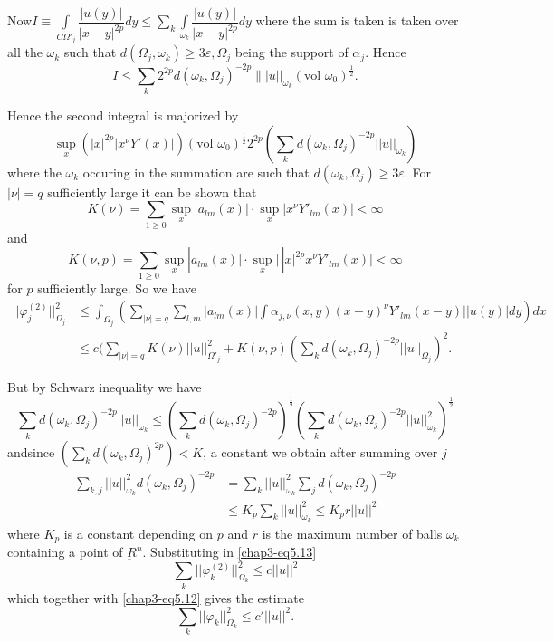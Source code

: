  Now\pageoriginale $I \equiv \int\limits_{C \Omega'_j}
 \dfrac{|u(y)|}{|x-y|^{2p}} dy \leq \sum\limits_{k} \int\limits_{\omega_k}
 \dfrac{|u(y)|}{|x-y|^{2p}} dy$ where the sum is taken is taken over
 all the $\omega_k$ such that $d(\Omega_j, \omega_k ) \geq 3
 \varepsilon, \Omega_j$ being the support of $\alpha_j$. Hence   
 $$
 I \leq \sum\limits_{k} 2^{2p}d (\omega_k, \Omega_j)^{-2p} \||
 u||_{\omega_k} (\text{vol } \omega_0)^{\frac{1}{2}}. 
 $$

 Hence the second integral is majorized by 
 $$
  \sup\limits_{x}(|x|^{2p}|x^\nu Y' (x)|) (\text{vol
  }\omega_0)^{\frac{1}{2}}2^{2p} \left(\sum_k d (\omega_k,
  \Omega_j)^{-2p}||u||_{\omega_k}\right)  
  $$
 where the $\omega_k$ occuring in the summation are such that
 $d(\omega_k, \Omega_j) \geq 3 \varepsilon $. 
 For $|\nu| = q$ sufficiently large it can be shown that 
 $$ 
 K(\nu ) = \sum\limits_{1 \geq 0}
 \sup\limits_{x}|a_{lm}(x)| \cdot \sup\limits_{x}|x^\nu
 Y'_{lm}(x)  | < \infty  
 $$
and
$$
K (\nu,p) = \sum\limits_{1\geq 0} \sup\limits_x | a_{lm} (x) \big| \cdot
\sup\limits_x \big| \, |x|^{2p} x^\nu Y'_{lm} (x) \big| < \infty
$$
for $p$ sufficiently large. So we have 
{\fontsize{10pt}{12pt}\selectfont
 \begin{align*}
\big|\big|\varphi^{(2)}_j \big|\big|^2_{\Omega_j} & \leq
\int_{\Omega_j} \left(\sum\limits_{|\nu | =q}\sum\limits_{l,m}| a_{lm}(x) | 
\int \alpha_{j,\nu}(x,y)  (x-y)^\nu Y'_{lm}(x-y) \big|\big|u (y) \big|
dy\right) dx\\
&  \leq c \Big( \sum\limits_{|\nu | =q} K (\nu ) ||u||^2_{\Omega'_j}+
K (\nu, p) \left(\sum_k d (\omega_k, \Omega_j
)^{-2p}||u||_{\Omega_j}\right)^2. 
\tag{5.13} \label{chap3-eq5.13}
 \end{align*}}\relax

But by Schwarz inequality we have 
$$
\sum_k d(\omega_k, \Omega_j)^{-2p} || u ||_{\omega_k} \leq \left(\sum_k d
(\omega_k, \Omega_j)^{-2p}\right)^{\frac{1}{2}}\left(\sum\limits_{k}d
(\omega_k,\Omega_j)^{-2p}||u||^2_{\omega_k}\right)^{\frac{1}{2}} 
$$
and\pageoriginale since $(\sum_k d(\omega_k, \Omega_j)^{2p}) < K$, a
constant we obtain after summing over $j$   
\begin{align*}
 \sum\limits_{k,j} ||u||^2_{\omega_k} d (\omega_k,  \Omega_j)^{-2p}
& = \sum\limits_{k}||u||^2_{\omega_k} \sum\limits_{j} d (\omega_k,
 \Omega_j)^{-2p}\\
&  \leq K_p \sum\limits_{k}||u||^2_{\omega_k}\leq K_p
 r ||u||^2 
\end{align*}
where $K_p$ is a constant depending on $p$ and $r$ is the maximum
number of balls $\omega_k$ containing a point of
$\underbar{R}^n$. Substituting in \eqref{chap3-eq5.13} 
$$
\sum\limits_{k}||\varphi^{(2)}_k||^2_{\Omega_k} \leq c ||u||^2
$$
which together with \eqref{chap3-eq5.12} gives the estimate 
 \begin{equation}
 \sum\limits_{k}||\varphi_k ||^2_{\Omega_k}\leq c'
 ||u||^2. \tag{5.14}\label{chap3-eq5.14} 
 \end{equation} 

